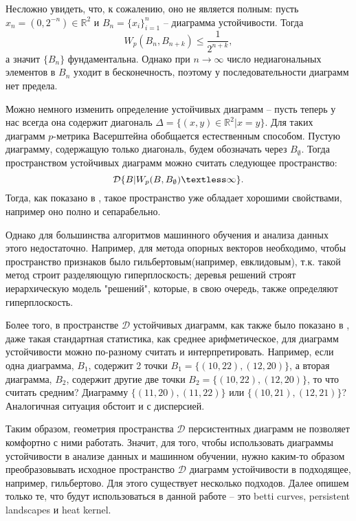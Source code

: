 Несложно увидеть, что, к сожалению, оно не является полным: пусть $x_n = (0, 2^{-n}) \in \mathbb{R}^2$ и $B_n = \{x_i\}_{i=1}^n$ -- диаграмма устойчивости. Тогда
\[
	W_p(B_n, B_{n+k}) \leq \frac{1}{2^{n+k}},
\]
а значит $\{B_n\}$ фундаментальна. Однако при $n \to \infty$ число недиагональных элементов в $B_n$ уходит в бесконечность, поэтому у последовательности диаграмм нет предела. 

Можно немного изменить определение устойчивых диаграмм -- пусть теперь у нас всегда она содержит диагональ $\Delta = \{(x,y) \in \mathbb{R}^2 | x=y\}$. Для таких диаграмм $p$-метрика Васерштейна обобщается естественным способом. Пустую диаграмму, содержащую только диагональ, будем обозначать через $B_\emptyset$. Тогда пространством устойчивых диаграмм можно считать следующее пространство:
\[
	\mathcal{D} \{ B | W_p(B, B_\emptyset) \textless \infty \}.
\]
Тогда, как показано в \cite{prop_measures}, такое пространство уже обладает хорошими свойствами, например оно полно и сепарабельно.

Однако для большинства алгоритмов машинного обучения и анализа данных этого недостаточно. Например, для метода опорных векторов необходимо, чтобы пространство признаков было гильбертовым(например, евклидовым), т.к. такой метод строит разделяющую гиперплоскость; деревья решений строят иерархическую модель "решений", которые, в свою очередь, также определяют гиперплоскость. 

Более того, в пространстве $\mathcal{D}$ устойчивых диаграмм, как также было показано в \cite{prop_measures}, даже такая стандартная статистика, как среднее арифметическое, для диаграмм устойчивости можно по-разному считать и интерпретировать. Например, если одна диаграмма, $B_1$, содержит 2 точки $B_1 = \{ (10, 22), (12, 20) \}$, а вторая диаграмма, $B_2$, содержит другие две точки $B_2 = \{ (10, 22), (12, 20) \}$, то что считать средним? Диаграмму $ \{ (11, 20), (11, 22) \}$ или $\{ (10,21), (12,21) \}$? Аналогичная ситуация обстоит и с дисперсией. 

Таким образом, геометрия пространства $\mathcal{D}$ персистентных диаграмм не позволяет комфортно с ними работать. Значит, для того, чтобы использовать диаграммы устойчивости в анализе данных и машинном обучении, нужно каким-то образом преобразовывать исходное пространство $\mathcal{D}$ диаграмм устойчивости в подходящее, например, гильбертово. Для этого существует несколько подходов. Далее опишем только те, что будут использоваться в данной работе -- это betti curves, persistent landscapes и heat kernel.

